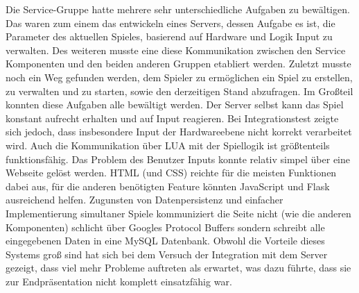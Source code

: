 Die Service-Gruppe hatte mehrere sehr unterschiedliche Aufgaben zu bewältigen. Das waren zum einem das entwickeln eines Servers,
dessen Aufgabe es ist, die Parameter des aktuellen Spieles, basierend auf Hardware und Logik Input zu verwalten.
Des weiteren musste eine diese Kommunikation zwischen den Service Komponenten und den beiden anderen Gruppen etabliert werden. 
Zuletzt musste noch ein Weg gefunden werden, dem Spieler zu ermöglichen ein Spiel zu erstellen, zu verwalten und zu starten, sowie den derzeitigen Stand abzufragen.
Im Großteil konnten diese Aufgaben alle bewältigt werden. Der Server selbst kann das Spiel konstant aufrecht erhalten und auf 
Input reagieren. Bei Integrationstest zeigte sich jedoch, dass insbesondere Input der Hardwareebene nicht korrekt verarbeitet wird. 
Auch die Kommunikation über LUA mit der Spiellogik ist größtenteils funktionsfähig.
Das Problem des Benutzer Inputs konnte relativ simpel über eine Webseite gelöst werden. 
HTML (und CSS) reichte für die meisten Funktionen dabei aus, für die anderen benötigten Feature könnten JavaScript und 
Flask ausreichend helfen. Zugunsten von Datenpersistenz und einfacher Implementierung simultaner Spiele kommuniziert die Seite 
nicht (wie die anderen Komponenten) schlicht über Googles Protocol Buffers sondern schreibt alle eingegebenen Daten in eine MySQL Datenbank.
Obwohl die Vorteile dieses Systems groß sind hat sich bei dem Versuch der Integration mit dem Server gezeigt, dass viel mehr Probleme 
auftreten als erwartet, was dazu führte, dass sie zur Endpräsentation nicht komplett einsatzfähig war.


